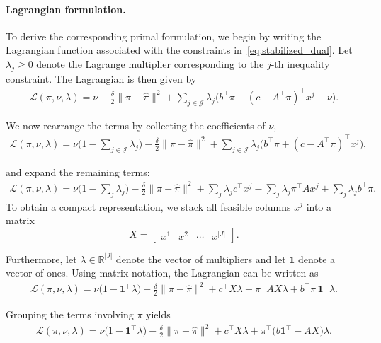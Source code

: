 \documentclass{book}
\theoremstyle{definition}
\numberwithin{algorithm_}{chapter}
\begin{document}
\medskip

\paragraph{Lagrangian formulation.}

To derive the corresponding primal formulation, we begin by writing the Lagrangian function associated with the constraints in~\eqref{eq:stabilized_dual}. Let $\lambda_j \ge 0$ denote the Lagrange multiplier corresponding to the $j$-th inequality constraint. The Lagrangian is then given by
\begin{align}
\mathcal{L}(\pi,\nu,\lambda)
=
\nu
- \frac{\delta}{2}\|\pi - \hat{\pi}\|^2
+
\sum_{j \in \mathcal{J}}
\lambda_j
\Big(
b^\top \pi
+
(c - A^\top \pi)^\top x^j
-
\nu
\Big).
\end{align}

We now rearrange the terms by collecting the coefficients of $\nu$,
\begin{align}
\mathcal{L}(\pi,\nu,\lambda)
=
\nu
\Big(
1 - \sum_{j \in \mathcal{J}} \lambda_j
\Big)
-
\frac{\delta}{2}\|\pi - \hat{\pi}\|^2
+
\sum_{j \in \mathcal{J}}
\lambda_j
\Big(
b^\top \pi
+
(c - A^\top \pi)^\top x^j
\Big),
\end{align}

and expand the remaining terms:
\begin{align}
\mathcal{L}(\pi,\nu,\lambda)
=
\nu
\Big(
1 - \sum_{j} \lambda_j
\Big)
-
\frac{\delta}{2}\|\pi - \hat{\pi}\|^2
+
\sum_{j}
\lambda_j c^\top x^j
-
\sum_{j}
\lambda_j \pi^\top A x^j
+
\sum_{j}
\lambda_j b^\top \pi .
\end{align}
To obtain a compact representation, we stack all feasible columns $x^j$ into a matrix
\[
X =
\begin{bmatrix}
x^1 & x^2 & \cdots & x^{|J|}
\end{bmatrix}.
\]

Furthermore, let $\lambda \in \mathbb{R}^{|J|}$ denote the vector of multipliers and let $\mathbf{1}$ denote a vector of ones. Using matrix notation, the Lagrangian can be written as
\begin{align}
\mathcal{L}(\pi,\nu,\lambda)
=
\nu
\big(
1 - \mathbf{1}^\top \lambda
\big)
-
\frac{\delta}{2}\|\pi - \hat{\pi}\|^2
+
c^\top X \lambda
-
\pi^\top A X \lambda
+
b^\top \pi \,
\mathbf{1}^\top \lambda .
\end{align}

Grouping the terms involving $\pi$ yields
\begin{align}
\mathcal{L}(\pi,\nu,\lambda)
=
\nu
\big(
1 - \mathbf{1}^\top \lambda
\big)
-
\frac{\delta}{2}\|\pi - \hat{\pi}\|^2
+
c^\top X \lambda
+
\pi^\top
\big(
b \mathbf{1}^\top
-
A X
\big) \lambda.
\end{align}
\end{document}

